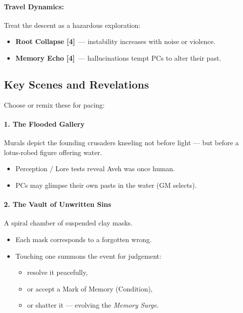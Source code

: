\documentclass[11pt]{article}
\newcommand{\Term}[1]{\textbf{#1}}
\begin{document}
\paragraph{Travel Dynamics:}
Treat the descent as a hazardous exploration:
\begin{itemize}[leftmargin=*]
  \item \Term{Root Collapse [4]}~--- instability increases with noise or violence.
  \item \Term{Memory Echo [4]}~--- hallucinations tempt PCs to alter their past.
\end{itemize}

\bigskip

\subsection*{Key Scenes and Revelations}

Choose or remix these for pacing:

\paragraph{1. The Flooded Gallery}
Murals depict the founding crusaders kneeling not before light ---
but before a lotus-robed figure offering water.

\begin{itemize}[leftmargin=*]
  \item Perception / Lore tests reveal Aveh was once human.
  \item PCs may glimpse their own pasts in the water (GM selects).
\end{itemize}

\paragraph{2. The Vault of Unwritten Sins}
A spiral chamber of suspended clay masks.

\begin{itemize}[leftmargin=*]
  \item Each mask corresponds to a forgotten wrong.
  \item Touching one summons the event for judgement:
  \begin{itemize}[leftmargin=*]
    \item resolve it peacefully,
    \item or accept a Mark of Memory (Condition),
    \item or shatter it --- evolving the \emph{Memory Surge}.
  \end{itemize}
\end{itemize}
\end{document}
